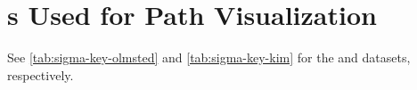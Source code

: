 \documentclass[preprint,12pt]{elsarticle}
\begin{document}
\section{s Used for Path Visualization} \label{sec:supp:sigma-key}

See \cref{tab:sigma-key-olmsted} and \cref{tab:sigma-key-kim} for the \citet{olmstedSurveyComputedGrain2009} and \citet{kimPhasefieldModeling3D2014} datasets, respectively.

\begin{table}[!htb]
    \centering
    \caption{Minimum $\Sigma$ (Sigma) \glspl{gb} and corresponding IDs used for path visualization within the original \citet{olmstedSurveyComputedGrain2009} dataset. }
    \label{tab:sigma-key-olmsted}
\end{table}

\begin{table}[!htb]
    \centering
    \caption{Minimum $\Sigma$ (Sigma) \glspl{gb} and corresponding IDs used for path visualization within the original \citet{kimPhasefieldModeling3D2014} dataset. }
    \label{tab:sigma-key-kim}
\end{table}

\printglossary

\clearpage


\end{document}
